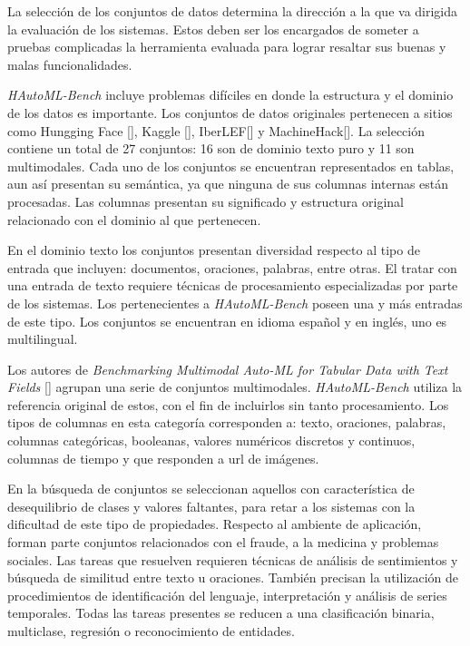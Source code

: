 La selección de los conjuntos de datos determina la dirección a la que va dirigida la evaluación de los sistemas. Estos deben ser los encargados de someter a 
pruebas complicadas la herramienta evaluada para lograr resaltar sus buenas y malas funcionalidades.

\textit{HAutoML-Bench} incluye problemas difíciles en donde la estructura y el dominio de los datos es importante. 
Los conjuntos de datos originales pertenecen a sitios como Hungging Face [\cite{67}], Kaggle [\cite{44}], IberLEF[\cite{68}] y MachineHack[\cite{69}]. La 
selección contiene un total de 27 conjuntos: 16 son de dominio texto puro y 11 son multimodales. Cada uno de los conjuntos se encuentran representados en tablas, 
aun así presentan su semántica, ya que ninguna de sus columnas internas están procesadas. Las columnas presentan su significado y estructura original 
relacionado con el dominio al que pertenecen.

En el dominio texto los conjuntos presentan diversidad respecto al tipo de entrada que incluyen: documentos, oraciones, palabras, entre otras. 
El tratar con una entrada de texto requiere técnicas de procesamiento especializadas por parte de los sistemas. Los pertenecientes a \textit{HAutoML-Bench} poseen una y 
más entradas de este tipo. Los conjuntos se encuentran en idioma español y en inglés, uno es multilingual.

Los autores de \textit{Benchmarking Multimodal Auto-ML for Tabular Data with Text Fields} [\cite{27}] agrupan una serie de conjuntos multimodales. \textit{HAutoML-Bench}
utiliza la referencia original de estos, con el fin de incluirlos sin tanto procesamiento. Los tipos de columnas en esta categoría corresponden a: texto, 
oraciones, palabras, columnas categóricas, booleanas, valores numéricos discretos y continuos, columnas de tiempo y que responden a url de imágenes.

En la búsqueda de conjuntos se seleccionan aquellos con característica de desequilibrio de clases y valores faltantes, para retar a los sistemas con la dificultad de este 
tipo de propiedades. Respecto al ambiente de aplicación, forman parte conjuntos relacionados con el fraude, a la medicina y problemas sociales. Las tareas que resuelven 
requieren técnicas de análisis de sentimientos y búsqueda de similitud entre texto u oraciones. También precisan la utilización de procedimientos de identificación 
del lenguaje, interpretación y análisis de series temporales. Todas las tareas presentes se reducen a una clasificación binaria, multiclase, regresión o 
reconocimiento de entidades.

